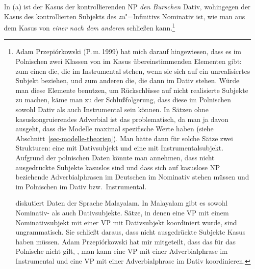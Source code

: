 In (a) ist der Kasus der kontrollierenden NP \emph{den Burschen} Dativ, wohingegen
der Kasus des kontrollierten Subjekts des \emph{zu}"=Infinitivs Nominativ ist,
wie man aus dem Kasus von \emph{einer nach dem anderen} schließen kann.\footnote{
        Adam Przepiórkowski (P.\,m.\,1999) hat mich darauf hingewiesen,
        dass es im Polnischen zwei Klassen von im Kasus übereinstimmenden Elementen
        gibt: zum einen die, die im Instrumental stehen, wenn sie sich auf ein
        unrealisiertes Subjekt beziehen, und zum anderen die, die dann im Dativ stehen.
        Würde man diese Elemente benutzen, um Rückschlüsse auf nicht realisierte Subjekte zu
        machen, käme man zu der Schlußfolgerung, dass diese im Polnischen sowohl Dativ als auch Instrumental
        sein können. In Sätzen ohne kasuskongruierendes Adverbial ist das problematisch, da man ja
        davon ausgeht, dass die Modelle maximal spezifische Werte haben (siehe
        Abschnitt~\ref{sec-modelle-theorien}). Man hätte dann für solche Sätze zwei Strukturen: eine
        mit Dativsubjekt und eine mit Instrumentalsubjekt.
        Aufgrund der polnischen Daten könnte man annehmen, dass nicht ausgedrückte Subjekte kasuslos sind
        und dass sich auf kasuslose NP beziehende Adverbialphrasen im Deutschen im Nominativ stehen müssen
        und im Polnischen im Dativ bzw.\ Instrumental.

        \citet{Hennis89} diskutiert Daten der Sprache Malayalam. In
        Malayalam gibt es sowohl Nominativ- als auch Dativsubjekte. Sätze, in denen eine VP mit
        einem Nominativsubjekt mit einer VP mit Dativsubjekt koordiniert wurde, sind ungrammatisch.
        Sie schließt daraus, dass nicht ausgedrückte Subjekte Kasus haben müssen.
        Adam Przepiórkowski hat mir mitgeteilt, dass das für das Polnische nicht gilt,
        \dash, man kann eine VP mit einer Adverbialphrase im Instrumental und eine VP
        mit einer Adverbialphrase im Dativ koordinieren.

}
